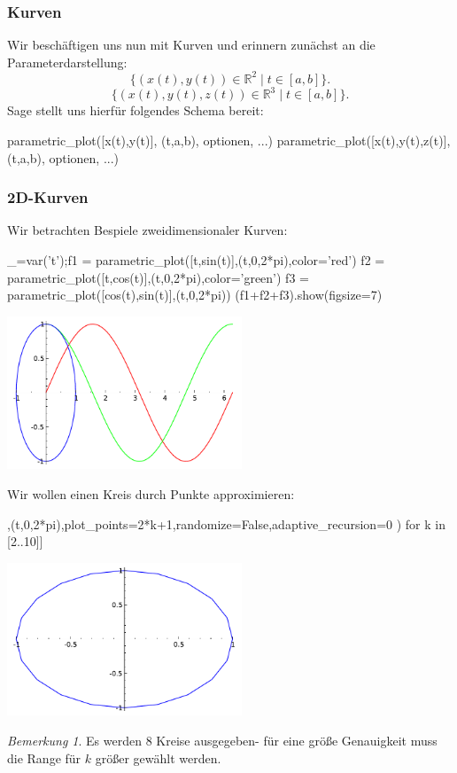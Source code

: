 \documentclass[fontsize=12pt,paper=a4,twoside,bibtotoc,idxtotoc,
liststotoc,pagesize,BCOR1.2cm,DIV15,chapterprefix,pagesize=pdftex]{scrbook}
\theoremstyle{plain}
\theoremstyle{definition}
\theoremstyle{remark}
\newtheorem{bem}[equation]{Bemerkung}
\begin{document}
\subsubsection{Kurven}
Wir beschäftigen uns nun mit Kurven und erinnern zunächst an die Parameterdarstellung: 
\[
 \{(x(t),y(t)) \in \mathbb{R}^2 \;|\; t \in [a,b]\}.
\]
\[
 \{(x(t),y(t),z(t)) \in \mathbb{R}^3 \;|\; t \in [a,b] \}.
\]
Sage stellt uns hierfür folgendes Schema bereit:
\begin{sagein}
parametric_plot([x(t),y(t)], (t,a,b), optionen, ...)
parametric_plot([x(t),y(t),z(t)], (t,a,b), optionen, ...)
\end{sagein}
\subsubsection{2D-Kurven}
Wir betrachten Bespiele zweidimensionaler Kurven:
\begin{sagein}
_=var('t');f1 = parametric_plot([t,sin(t)],(t,0,2*pi),color='red')
f2 = parametric_plot([t,cos(t)],(t,0,2*pi),color='green')
f3 = parametric_plot([cos(t),sin(t)],(t,0,2*pi))
(f1+f2+f3).show(figsize=7)
\end{sagein}
\begin{center}
\includegraphics[width=7cm]{parametric2d.pdf} 
\end{center}
Wir wollen einen Kreis durch Punkte approximieren:
\begin{sagein}
[parametric_plot([cos(t),sin(t)],(t,0,2*pi),plot_points=2*k+1,randomize=False,adaptive_recursion=0 ) for k in [2..10]]
\end{sagein}
\begin{center}
\includegraphics[width=7cm]{parametric2d_2.pdf} 
\end{center}
\begin{bem}
 Es werden 8 Kreise ausgegeben- für eine größe Genauigkeit muss die Range für $k$ größer gewählt werden.
\end{bem}
\end{document}
